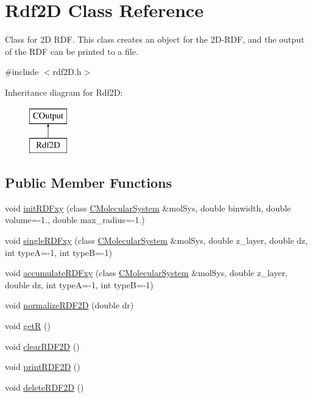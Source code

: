 \hypertarget{classRdf2D}{}\section{Rdf2D Class Reference}
\label{classRdf2D}


Class for 2D R\+DF. This class creates an object for the 2D-\/\+R\+DF, and the output of the R\+DF can be printed to a file.  




{\ttfamily \#include $<$rdf2\+D.\+h$>$}

Inheritance diagram for Rdf2D\+:\begin{figure}[H]
\begin{center}
\leavevmode
\includegraphics[height=2.000000cm]{classRdf2D}
\end{center}
\end{figure}
\subsection*{Public Member Functions}
\begin{DoxyCompactItemize}
\item 
void \mbox{\hyperlink{classRdf2D_a767f006de6412394a59f1cae5f7f6b35}{init\+R\+D\+Fxy}} (class \mbox{\hyperlink{classCMolecularSystem}{C\+Molecular\+System}} \&mol\+Sys, double binwidth, double volume=-\/1., double max\+\_\+radius=-\/1.)
\item 
void \mbox{\hyperlink{classRdf2D_afc5ff73aa9c126184e94ee3abfc14ff4}{single\+R\+D\+Fxy}} (class \mbox{\hyperlink{classCMolecularSystem}{C\+Molecular\+System}} \&mol\+Sys, double z\+\_\+layer, double dz, int typeA=-\/1, int typeB=-\/1)
\item 
void \mbox{\hyperlink{classRdf2D_a6c716851d80fd2a7dcfefd219892d87b}{accumulate\+R\+D\+Fxy}} (class \mbox{\hyperlink{classCMolecularSystem}{C\+Molecular\+System}} \&mol\+Sys, double z\+\_\+layer, double dz, int typeA=-\/1, int typeB=-\/1)
\item 
void \mbox{\hyperlink{classRdf2D_aaf6d00ec728e8c694ed2932332691c0d}{normalize\+R\+D\+F2D}} (double dr)
\item 
void \mbox{\hyperlink{classRdf2D_a3c8153b303733b7e5d320f9b20f37b32}{getR}} ()
\item 
void \mbox{\hyperlink{classRdf2D_a9658a9bb2229afda0d743bdc05a27411}{clear\+R\+D\+F2D}} ()
\item 
void \mbox{\hyperlink{classRdf2D_aae00c1526117f6ac63d2c13354b6c404}{print\+R\+D\+F2D}} ()
\item 
void \mbox{\hyperlink{classRdf2D_a8008421c8aedff5887160b455879d36b}{delete\+R\+D\+F2D}} ()
\end{DoxyCompactItemize}
